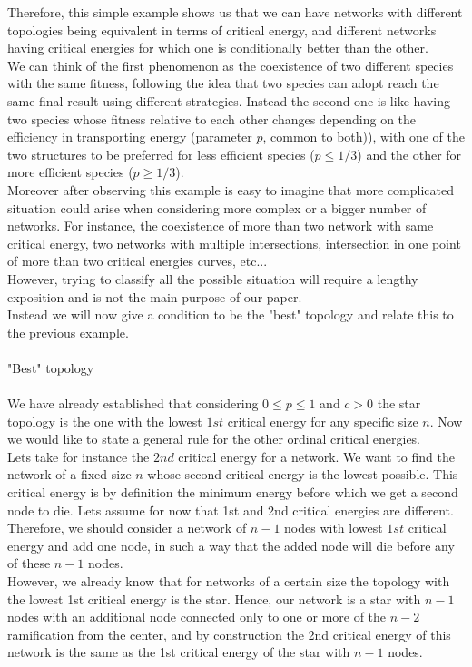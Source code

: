 \documentclass{amsart}
\theoremstyle{plain}
\numberwithin{equation}{section}
\begin{document}
Therefore, this simple example shows us that we can have networks with different topologies being equivalent in terms of critical energy, and different networks having critical energies for which one is conditionally better than the other.\\
We can think of the first phenomenon as the coexistence of two different species with the same fitness, following the idea that two species can adopt reach the same final result using different strategies. Instead the second one is like having two species whose fitness relative to each other changes depending on the efficiency in transporting energy (parameter $p$, common to both)), with one of the two structures to be preferred for less efficient species ($p\leq1/3$) and the other for more efficient species ($p\geq1/3$).\\
Moreover after observing this example is easy to imagine that more complicated situation could arise when considering more complex or a bigger number of networks. For instance, the coexistence of more than two network with same critical energy, two networks with multiple intersections, intersection in one point of more than two critical energies curves, etc... \\
However, trying to classify all the possible situation will require a lengthy exposition and is not the main purpose of our paper. \\
Instead we will now give a condition to be the "best" topology and relate this to the previous example.\\
\\
"Best" topology\\
\\
We have already established that considering $0\leq p\leq 1$ and $c>0$ the star topology is the one with the lowest $1st$ critical energy for any specific size $n$. Now we would like to state a general rule for the other ordinal critical energies.\\
Lets take for instance the $2nd$ critical energy for a network. We want to find the network of a fixed size $n$ whose second critical energy is the lowest possible. This critical energy is by definition the minimum energy before which we get a second node to die. Lets assume for now that 1st and 2nd critical energies are different. Therefore, we should consider a network of $n-1$ nodes with lowest $1st$ critical energy and add one node, in such a way that the added node will die before any of these $n-1$ nodes.\\ However, we already know that for networks of a certain size the topology with the lowest 1st critical energy is the star. Hence, our network is a star with $n-1$ nodes with an additional node connected only to one or more of the $n-2$ ramification from the center, and by construction the 2nd critical energy of this network is the same as the 1st critical energy of the star with $n-1$ nodes.\\
\end{document}
